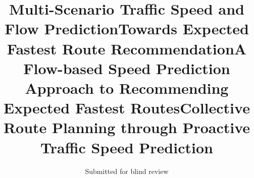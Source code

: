 \documentclass[acmlarge]{acmart}
\newcommand{\eat}[1]{}
\begin{document}
\title{Multi-Scenario Traffic Speed and Flow Prediction}

\title{Towards Expected Fastest Route Recommendation}

\title{A Flow-based Speed Prediction Approach to Recommending Expected Fastest Routes}

\title{Collective Route Planning through Proactive Traffic Speed Prediction}


\eat{ %
\author{Renjun Hu}
\orcid{1234-5678-9012-3456}
\affiliation{%
  \institution{SKLSDE Lab, Beihang University}
  \streetaddress{37 Xueyuan Rd}
  \city{Haidian}
  \state{Beijing}
  \country{China}
  \postcode{100191}}
\email{hurenjun@buaa.edu.cn}
\author{Junming Liu}
\affiliation{%
  \institution{Rutgers University} %
  \streetaddress{1 Washington Park}
  \city{Newark}
  \state{NJ}
  \postcode{07102}
  \country{USA}}
\email{jl1433@rutgers.edu}
\author{Yanchi Liu}
\affiliation{%
  \institution{Rutgers University} %
  \streetaddress{1 Washington Park}
  \city{Newark}
  \state{NJ}
  \postcode{07102}
  \country{USA}}
\email{yanchi.liu@rutgers.edu}
\author{Hui Xiong}
\affiliation{%
  \institution{Rutgers University} %
  \streetaddress{1 Washington Park}
  \city{Newark}
  \state{NJ}
  \postcode{07102}
  \country{USA}}
\email{hxiong@rutgers.edu}
\author{Shuai Ma}
\affiliation{%
  \institution{SKLSDE Lab, Beihang University}
  \streetaddress{37 Xueyuan Rd}
  \city{Haidian}
  \state{Beijing}
  \country{China}
  \postcode{100191}}
\email{mashuai@buaa.edu.cn}
\author{Jinpeng Huai}
\affiliation{%
  \institution{SKLSDE Lab, Beihang University}
  \streetaddress{37 Xueyuan Rd}
  \city{Haidian}
  \state{Beijing}
  \country{China}
  \postcode{100191}}
\email{huaijp@buaa.edu.cn}
}

\author{Submitted for blind review}





\eat{   %
\author{
Renjun Hu$^{1,2}$, Junming Liu$^3$, Hui Xiong$^3$, Shuai Ma$^{1,2}$, Jinpeng Huai$^{1,2}$}
\affiliation{%
  \institution{$^1$ SKLSDE Lab, Beihang University, China}
  \institution{$^2$ Beijing Advanced Innovation Center for Big Data and Brain Computing, China}
  \institution{$^3$ Rutgers University, USA}
  \institution{\{hurenjun, mashuai, huaijp\}@buaa.edu.cn \hspace{12ex} \{jl1433, hxiong\}@rutgers.edu}
}
}%
\end{document}
